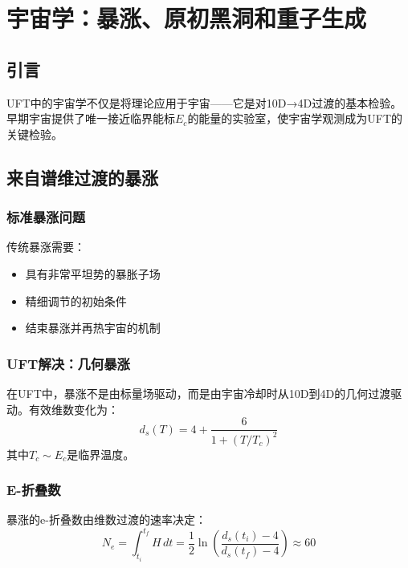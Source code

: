 \section{宇宙学：暴涨、原初黑洞和重子生成}
\label{sec:cosmology_complete}

\subsection{引言}

UFT中的宇宙学不仅是将理论应用于宇宙——它是对10D→4D过渡的基本检验。早期宇宙提供了唯一接近临界能标$E_c$的能量的实验室，使宇宙学观测成为UFT的关键检验。

\subsection{来自谱维过渡的暴涨}

\subsubsection{标准暴涨问题}

传统暴涨需要：
\begin{itemize}
    \item 具有非常平坦势的暴胀子场
    \item 精细调节的初始条件
    \item 结束暴涨并再热宇宙的机制
\end{itemize}

\subsubsection{UFT解决：几何暴涨}

\begin{insight}
在UFT中，暴涨不是由标量场驱动，而是由宇宙冷却时从10D到4D的几何过渡驱动。有效维数变化为：
\begin{equation}
    d_s(T) = 4 + \frac{6}{1+(T/T_c)^2}
\end{equation}
其中$T_c \sim E_c$是临界温度。
\end{insight}

\subsubsection{E-折叠数}

\begin{theorem}[来自维数变化的E-折叠]
暴涨的e-折叠数由维数过渡的速率决定：
\begin{equation}
    N_e = \int_{t_i}^{t_f} H \, dt = \frac{1}{2}\ln\left(\frac{d_s(t_i)-4}{d_s(t_f)-4}\right) \approx 60
\end{equation}
\end{theorem}

